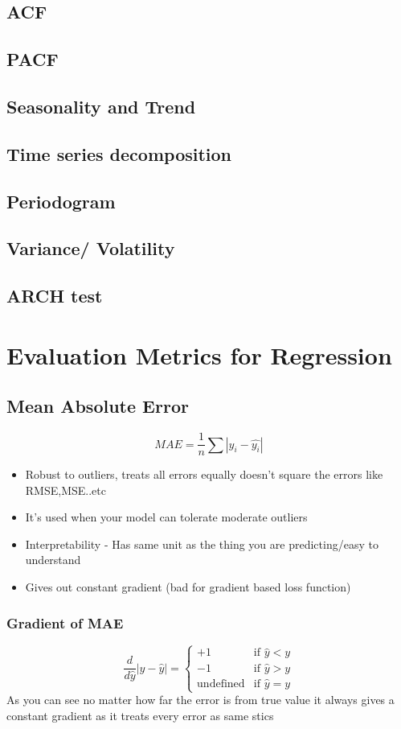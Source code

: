 \documentclass[12pt]{extarticle}
\begin{document}
\subsection{ACF}
\subsection{PACF}
\subsection*{Seasonality and Trend}
\subsection{Time series decomposition}
\subsection{Periodogram}
\subsection*{Variance/ Volatility}
\subsection{ARCH test}




\section{Evaluation Metrics for Regression}

\subsection{Mean Absolute Error}  

$$MAE = \frac{1}{n}\sum{|y_i - \hat{y_i}|}$$ 
\begin{itemize}
    \item Robust to outliers, treats all errors equally doesn’t square the errors like RMSE,MSE..etc 
    \item It’s used when your model can tolerate moderate outliers  
    \item Interpretability - Has same unit as the thing you are predicting/easy to understand 
    \item Gives out constant gradient (bad for gradient based loss function) 
\end{itemize}
 
\subsubsection{Gradient of MAE} 
$$
\frac{d}{d\hat{y}}|y - \hat{y}| = 
\begin{cases} 
+1 & \text{if }  \hat{y} < y \\ 
-1 & \text{if }  \hat{y} > y \\ 
\text{undefined} & \text{if } \hat{y} = y 
\end{cases} 
$$
As you can see no matter how far the error is from true value it always gives a constant gradient as it treats every error as same
stics
\end{document}
